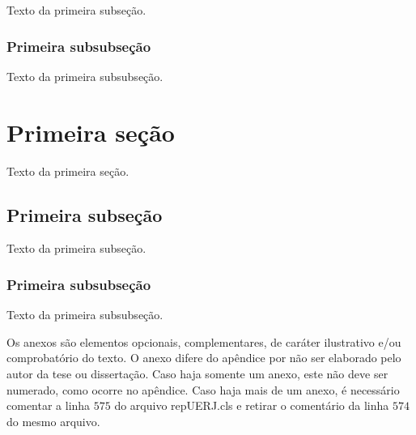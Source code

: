 Texto da primeira subseção.

\subsubsection{Primeira subsubseção}

Texto da primeira subsubseção.



\section{Primeira seção}

Texto da primeira seção.

\subsection{Primeira subseção}

Texto da primeira subseção.

\subsubsection{Primeira subsubseção}

Texto da primeira subsubseção.


\annex %


Os anexos são elementos opcionais, complementares, de caráter ilustrativo e/ou comprobatório do texto. O anexo difere do apêndice por não ser elaborado pelo autor da tese ou dissertação. Caso haja somente um anexo, este não deve ser numerado, como ocorre no apêndice.
Caso haja mais de um anexo, é necessário comentar a linha $575$ do arquivo repUERJ.cls e retirar o comentário da linha $574$ do mesmo arquivo.

